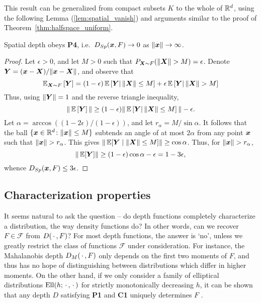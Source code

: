 \begin{remark}
    This result can be generalized from compact subsets $K$ to the whole of
    $\mathbb{R}^d$, using the following Lemma (\ref{lem:spatial_vanish}) and arguments
    similar to the proof of Theorem~\ref{thm:halfspace_uniform}.
\end{remark}

\begin{lemma}\label{lem:spatial_vanish}
    Spatial depth obeys \textbf{P4}, i.e.\ $D_{Sp}(\bm{x}, F) \to 0$ as
    $\Vert \bm{x} \Vert \to \infty$.
\end{lemma}
\begin{proof}
    Let $\epsilon > 0$, and let $M > 0$ such that $P_{\bm{X} \sim F}(\Vert \bm{X} \Vert >
    M) = \epsilon$.
    Denote $\bm{Y} = (\bm{x} - \bm{X}) / \Vert \bm{x} - \bm{X} \Vert$, and observe that
    \begin{equation}
        \operatorname{\mathbb{E}}_{\bm{X} \sim F}\left[\bm{Y}\right]
        = (1 - \epsilon)\operatorname{\mathbb{E}}\left[\bm{Y}|\, \Vert \bm{X} \Vert \leq M\right] +
          \epsilon\operatorname{\mathbb{E}}\left[\bm{Y}|\, \Vert \bm{X} \Vert > M\right]
    \end{equation}
    Thus, using $\Vert \bm{Y} \Vert = 1$ and the reverse triangle inequality,
    \begin{equation}
        \Vert \operatorname{\mathbb{E}}\left[\bm{Y}\right] \Vert
        \geq (1 - \epsilon)\Vert \operatorname{\mathbb{E}}\left[\bm{Y}|\, \Vert \bm{X} \Vert \leq M\right] \Vert - \epsilon.
    \end{equation}
    Let $\alpha = \arccos((1 - 2\epsilon)/(1 - \epsilon))$, and let $r_\alpha =
    M/\sin\alpha$.
    It follows that the ball $\{\bm{x} \in \mathbb{R}^d\colon \Vert \bm{x} \Vert \leq M\}$
    subtends an angle of at most $2\alpha$ from any point $\bm{x}$ such that
    $\Vert \bm{x} \Vert > r_\alpha$.
    This gives $\Vert \operatorname{\mathbb{E}}[\bm{Y} \mid \Vert \bm{X} \Vert \leq M] \Vert \geq \cos\alpha$.
    Thus, for $\Vert \bm{x} \Vert > r_\alpha$,
    \begin{equation}
        \Vert \operatorname{\mathbb{E}}[\bm{Y}] \Vert \geq (1 - \epsilon)\cos\alpha - \epsilon = 1 - 3\epsilon,
    \end{equation}
    whence $D_{Sp}(\bm{x}, F) \leq 3\epsilon$.
\end{proof}



\subsection{Characterization properties}

It seems natural to ask the question -- do depth functions completely
characterize a distribution, the way density functions do?
In other words, can we recover $F \in \mathscr{F}$ from $D(\,\cdot\,, F)$?
For most depth functions, the answer is `no', unless we greatly restrict the
class of functions $\mathscr{F}$ under consideration.
For instance, the Mahalanobis depth $D_M(\,\cdot\,, F)$ only depends on the first
two moments of $F$, and thus has no hope of distinguishing between
distributions which differ in higher moments.
On the other hand, if we only consider a family of elliptical distributions
$\operatorname{Ell}(h; \,\cdot\,, \,\cdot\,)$ for strictly monotonically decreasing $h$, it can be
shown that any depth $D$ satisfying \textbf{P1} and \textbf{C1} uniquely
determines $F$ \parencite{mosler-mozharovskyi-2022}.


